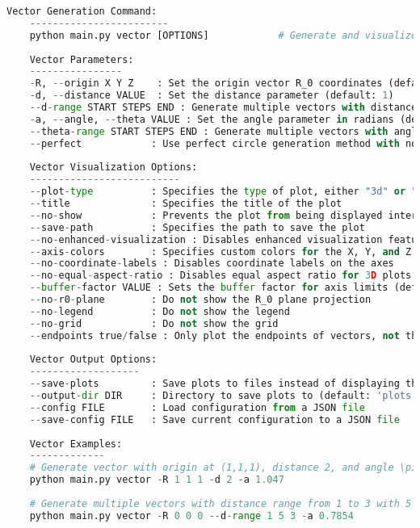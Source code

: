 \begin{lstlisting}[language=Python]
    Vector Generation Command:
    ------------------------
    python main.py vector [OPTIONS]            # Generate and visualize orthogonal vectors
    
    Vector Parameters:
    ----------------
    -R, --origin X Y Z    : Set the origin vector R_0 coordinates (default: 0 0 0)
    -d, --distance VALUE  : Set the distance parameter (default: 1)
    --d-range START STEPS END : Generate multiple vectors with distance values from START to END with STEPS steps
    -a, --angle, --theta VALUE : Set the angle parameter in radians (default: \pi/4)
    --theta-range START STEPS END : Generate multiple vectors with angle values from START to END with STEPS steps
    --perfect            : Use perfect circle generation method with normalized basis vectors
    
    Vector Visualization Options:
    --------------------------
    --plot-type          : Specifies the type of plot, either "3d" or "2d" (default: "3d")
    --title              : Specifies the title of the plot
    --no-show            : Prevents the plot from being displayed interactively
    --save-path          : Specifies the path to save the plot
    --no-enhanced-visualization : Disables enhanced visualization features
    --axis-colors        : Specifies custom colors for the X, Y, and Z axes as three space-separated values
    --no-coordinate-labels : Disables coordinate labels on the axes
    --no-equal-aspect-ratio : Disables equal aspect ratio for 3D plots
    --buffer-factor VALUE : Sets the buffer factor for axis limits (default: 0.2)
    --no-r0-plane        : Do not show the R_0 plane projection
    --no-legend          : Do not show the legend
    --no-grid            : Do not show the grid
    --endpoints true/false : Only plot the endpoints of vectors, not the arrows (default: false)
    
    Vector Output Options:
    -------------------
    --save-plots         : Save plots to files instead of displaying them
    --output-dir DIR     : Directory to save plots to (default: 'plots')
    --config FILE        : Load configuration from a JSON file
    --save-config FILE   : Save current configuration to a JSON file
    
    Vector Examples:
    -------------
    # Generate vector with origin at (1,1,1), distance 2, and angle \pi/3
    python main.py vector -R 1 1 1 -d 2 -a 1.047
    
    # Generate multiple vectors with distance range from 1 to 3 with 5 steps
    python main.py vector -R 0 0 0 --d-range 1 5 3 -a 0.7854
    

\end{lstlisting}
